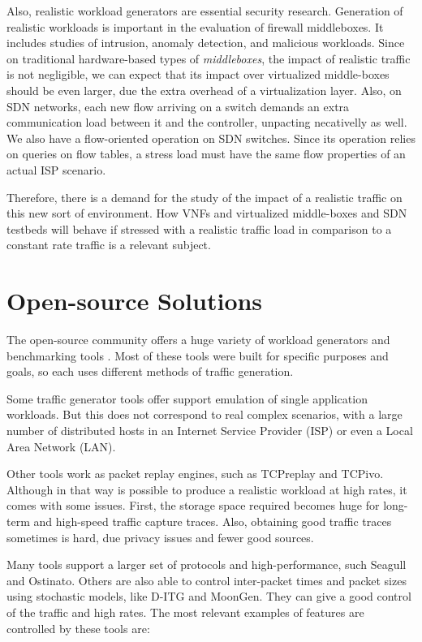 Also, realistic workload generators are essential security research\cite{ditg-paper}.  Generation of realistic workloads is important in the evaluation of firewall middleboxes. It includes studies of intrusion, anomaly detection, and malicious workloads\cite{ditg-paper}.   Since on traditional hardware-based types of \textit{middleboxes}, the impact of realistic traffic is not negligible, we can expect that its impact over virtualized middle-boxes should be even larger, due the extra overhead of a virtualization layer. Also, on SDN networks, each new flow arriving on a switch demands an extra communication load between it and the controller, unpacting necativelly as well. 
We also have a flow-oriented operation on SDN switches. Since its operation relies on queries on flow tables, a stress load must have the same flow properties of an actual ISP scenario.


Therefore, there is a demand for the study of the impact of a realistic traffic on this new sort of environment. How VNFs and virtualized middle-boxes and SDN testbeds will behave if stressed with a realistic traffic load in comparison to a constant rate traffic is a relevant subject.  

\section{Open-source Solutions}


The open-source community offers a huge variety of workload generators and benchmarking tools \cite{ditg-paper}\cite{validate-trafficgen}\cite{comparative-trafficgen-tools}\cite{performance-trafficgen}. Most of these tools were built for specific purposes and goals, so each uses different methods of traffic generation. 


Some traffic generator tools offer support emulation of single application workloads. But this does not correspond to real complex scenarios, with a large number of distributed hosts in an Internet Service Provider (ISP) or even a Local Area Network (LAN).


Other tools work as packet replay engines, such as TCPreplay and TCPivo. Although in that way is possible to produce a realistic workload at high rates, it comes with some issues. First, the storage space required becomes huge for long-term and high-speed traffic capture traces. Also, obtaining good traffic traces sometimes is hard, due privacy issues and fewer good sources. 


Many tools support a larger set of protocols and high-performance, such Seagull and Ostinato. Others are also able to control inter-packet times and packet sizes using stochastic models, like D-ITG\cite{ditg-paper} and MoonGen. They can give a good control of the traffic and high rates. The most relevant examples of features are controlled by these tools are:


